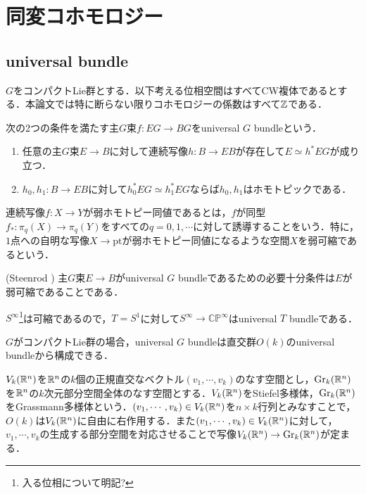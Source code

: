 \section{同変コホモロジー}
\subsection{universal bundle}

$G$をコンパクトLie群とする．以下考える位相空間はすべてCW複体であるとする．本論文では特に断らない限りコホモロジーの係数はすべて$\mathbb{Z}$である．

\begin{defin}
  次の2つの条件を満たす主$G$束$f\colon EG\rightarrow BG$をuniversal $G$ bundleという．
  \begin{enumerate}
    \item 任意の主$G$束$E\rightarrow B$に対して連続写像$h\colon B\rightarrow EB$が存在して$E\simeq h^*EG$が成り立つ．
    \item $h_0,h_1\colon B\rightarrow EB$に対して$h_0^*EG\simeq h_1^*EG$ならば$h_0,h_1$はホモトピックである．
  \end{enumerate}
\end{defin}

\begin{defin}
  連続写像$f\colon X\rightarrow Y$が弱ホモトピー同値であるとは，$f$が同型$f_*\colon\pi_q(X)\rightarrow \pi_q(Y)$をすべての$q=0,1,\cdots$に対して誘導することをいう．特に，$1$点への自明な写像$X\rightarrow \text{pt}$が弱ホモトピー同値になるような空間$X$を弱可縮であるという．
\end{defin}

\begin{theo}(Steenrod \cite{steenrod})\label{steenrod}
  主$G$束$E\rightarrow B$がuniversal $G$ bundleであるための必要十分条件は$E$が弱可縮であることである．
\end{theo}

\begin{eg}
  $S^\infty$\footnote{入る位相について明記?}は可縮であるので，$T=S^1$に対して$S^\infty\rightarrow \mathbb{CP}^\infty$はuniversal $T$ bundleである．
\end{eg}

$G$がコンパクトLie群の場合，universal $G$ bundleは直交群$O(k)$のuniversal bundleから構成できる．

$V_k(\mathbb{R}^n)$を$\mathbb{R}^n$の$k$個の正規直交なベクトル$(v_1,\cdots,v_k)$のなす空間とし，$\text{Gr}_k(\mathbb{R}^n)$を$\mathbb{R}^n$の$k$次元部分空間全体のなす空間とする．$V_k(\mathbb{R}^n)$をStiefel多様体，$\text{Gr}_k(\mathbb{R}^n)$をGrassmann多様体という．$(v_1,\cdots,v_k)\in V_k(\mathbb{R}^n)$を$n\times k$行列とみなすことで，$O(k)$は$V_k(\mathbb{R}^n)$に自由に右作用する．また$(v_1,\cdots,v_k)\in V_k(\mathbb{R}^n)$に対して，$v_1,\cdots,v_k$の生成する部分空間を対応させることで写像$V_k(\mathbb{R}^n)\rightarrow \text{Gr}_k(\mathbb{R}^n)$が定まる．

